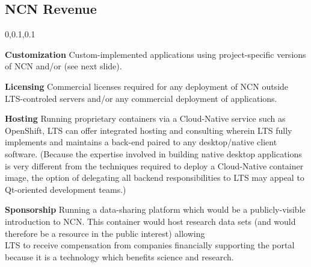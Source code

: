 
\begin{frame}{}
\section{NCN Revenue}
\vspace{-.5em}	

{\selectfont
\hspace*{-20pt}\begin{minipage}{1.1\textwidth}
\vspace{4pt}


		
\begin{lightquadblockc}{0,0.1,0.1}{}
\begin{center}\begin{minipage}{1.05\textwidth}
{\fontsize{16}{23}\selectfont \setlength{\leftmargini}{30pt}\begin{enumerate}
\dmitem \textbf{Customization} \hspace{.5em} Custom-implemented applications 
using project-specific versions of NCN and/or \AtR{} 
(see next slide).\vspace{10pt}

\dmitem \textbf{Licensing}  \hspace{.5em} Commercial licenses required for 
any deployment of NCN outside LTS-controled 
servers and/or any commercial deployment of \AtR{} 
applications.\vspace{10pt}

\dmitem \textbf{Hosting}  \hspace{.5em} Running proprietary 
containers via a Cloud-Native service such as 
OpenShift, LTS can offer integrated hosting and consulting 
wherein LTS fully implements and maintains a back-end 
paired to any desktop/native client software.
(Because the expertise involved 
in building native desktop applications is very different 
from the techniques required to deploy a Cloud-Native container 
image, the option of delegating all 
backend responsibilities to LTS may 
appeal to Qt-oriented development teams.)\vspace{10pt}

\dmitem \textbf{Sponsorship}  \hspace{.5em} 
Running a data-sharing platform which would be a 
publicly-visible introduction to NCN.  
This  container 
would host research data sets (and 
would therefore be a resource in the public 
interest) allowing \\LTS to receive compensation 
from companies financially supporting the 
portal because it is a technology which
benefits science and research.
\end{enumerate}
}\end{minipage}
\end{center}
\end{lightquadblockc}
\end{minipage}

}

\end{frame}
